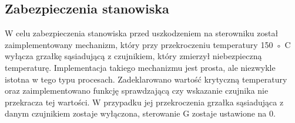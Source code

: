 \subsection{Zabezpieczenia stanowiska}
\label{lab:zad2}

W	celu	zabezpieczenia	stanowiska	przed	uszkodzeniem	na	sterowniku	został	
zaimplementowany	mechanizm,	który	przy	przekroczeniu	temperatury	150	◦
C	
wyłącza	grzałkę	sąsiadującą	z	czujnikiem,	który	zmierzył	niebezpieczną	
temperaturę.	Implementacja	takiego	mechanizmu	jest	prosta,	ale	niezwykle	
istotna	w	tego	typu	procesach.	Zadeklarowano	wartość	krytyczną	temperatury	
oraz	zaimplementowano	funkcję	sprawdzającą	czy	wskazanie	czujnika	nie	
przekracza	tej	wartości. W	przypadku	jej	przekroczenia	grzałka	sąsiadująca	z	
danym	czujnikiem	zostaje	wyłączona,	sterowanie	G	zostaje	ustawione	na	0.



\newpage
